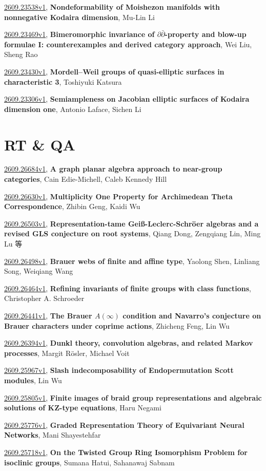 \documentclass[9pt, a4paper]{article}
\theoremstyle{plain}
\theoremstyle{definition}
\theoremstyle{remark}
\newcommand{\arxiv}[3]{\href{https://arxiv.org/abs/#1}{#1}, \textbf{\textcolor{arxivblue}{#2}}, #3}
\begin{document}
\arxiv{2609.23538v1}{Nondeformability of Moishezon manifolds with nonnegative Kodaira dimension}{Mu-Lin Li}

\arxiv{2609.23469v1}{Bimeromorphic invariance of $\partial\bar\partial$-property and blow-up formulae I: counterexamples and derived category approach}{Wei Liu, Sheng Rao}

\arxiv{2609.23430v1}{Mordell--Weil groups of quasi-elliptic surfaces in characteristic 3}{Toshiyuki Katsura}

\arxiv{2609.23306v1}{Semiampleness on Jacobian elliptic surfaces of Kodaira dimension one}{Antonio Laface, Sichen Li}


\section{RT \& QA}
\arxiv{2609.26684v1}{A graph planar algebra approach to near-group categories}{Cain Edie-Michell, Caleb Kennedy Hill}

\arxiv{2609.26630v1}{Multiplicity One Property for Archimedean Theta Correspondence}{Zhibin Geng, Kaidi Wu}

\arxiv{2609.26503v1}{Representation-tame Geiß-Leclerc-Schröer algebras and a revised GLS conjecture on root systems}{Qiang Dong, Zengqiang Lin, Ming Lu 等}

\arxiv{2609.26498v1}{Brauer webs of finite and affine type}{Yaolong Shen, Linliang Song, Weiqiang Wang}

\arxiv{2609.26464v1}{Refining invariants of finite groups with class functions}{Christopher A. Schroeder}

\arxiv{2609.26441v1}{The Brauer $A(\infty)$ condition and Navarro's conjecture on Brauer characters under coprime actions}{Zhicheng Feng, Lin Wu}

\arxiv{2609.26394v1}{Dunkl theory, convolution algebras, and related Markov processes}{Margit Rösler, Michael Voit}

\arxiv{2609.25967v1}{Slash indecomposability of Endopermutation Scott modules}{Lin Wu}

\arxiv{2609.25805v1}{Finite images of braid group representations and algebraic solutions of KZ-type equations}{Haru Negami}

\arxiv{2609.25776v1}{Graded Representation Theory of Equivariant Neural Networks}{Mani Shayestehfar}

\arxiv{2609.25718v1}{On the Twisted Group Ring Isomorphism Problem for isoclinic groups}{Sumana Hatui, Sahanawaj Sabnam}
\end{document}
